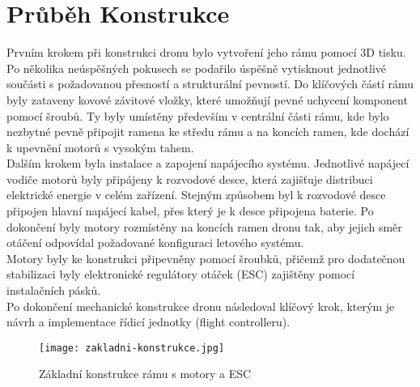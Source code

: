 \documentclass[12pt]{report}
\begin{document}
\chapter[Průběh Konstrukce]{Průběh Konstrukce}
Prvním krokem při konstrukci dronu bylo vytvoření jeho rámu pomocí 3D tisku. Po několika neúspěšných pokusech se podařilo úspěšně vytisknout jednotlivé součásti s požadovanou přesností a strukturální pevností. Do klíčových částí rámu byly zataveny kovové závitové vložky, které umožňují pevné uchycení komponent pomocí šroubů. Ty byly umístěny především v centrální části rámu, kde bylo nezbytné pevně připojit ramena ke středu rámu a na koncích ramen, kde dochází k upevnění motorů s vysokým tahem.\\
Dalším krokem byla instalace a zapojení napájecího systému. Jednotlivé napájecí vodiče motorů byly připájeny k rozvodové desce, která zajišťuje distribuci elektrické energie v celém zařízení. Stejným způsobem byl k rozvodové desce připojen hlavní napájecí kabel, přes který je k desce připojena baterie. Po dokončení byly motory rozmístěny na koncích ramen dronu tak, aby jejich směr otáčení odpovídal požadované konfiguraci letového systému.\\
Motory byly ke konstrukci připevněny pomocí šroubků, přičemž pro dodatečnou stabilizaci byly elektronické regulátory otáček (ESC) zajištěny pomocí instalačních pásků.\\
Po dokončení mechanické konstrukce dronu následoval klíčový krok, kterým je návrh a implementace řídicí jednotky (flight controlleru).
\begin{figure}[H]
	\centering
	\texttt{[image: zakladni-konstrukce.jpg]}
	\caption{Základní konstrukce rámu s motory a ESC}
	\label{fig:zakladni-konstrukce.jpg}
\end{figure}
\end{document}
